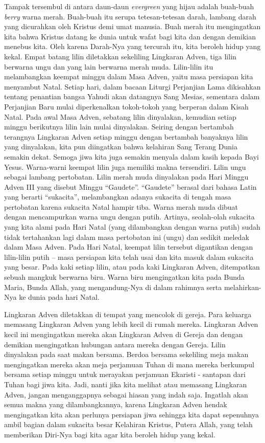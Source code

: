 Tampak tersembul di antara daun-daun \textit{evergreen} yang hijau adalah buah-buah \textit{berry} warna merah. Buah-buah itu serupa tetesan-tetesan darah, lambang darah yang dicurahkan oleh Kristus demi umat manusia. Buah merah itu mengingatkan kita bahwa Kristus datang ke dunia untuk wafat bagi kita dan dengan demikian menebus kita. Oleh karena Darah-Nya yang tercurah itu, kita beroleh hidup yang kekal. Empat batang lilin diletakkan sekeliling Lingkaran Adven, tiga lilin berwarna ungu dan yang lain berwarna merah muda. Lilin-lilin itu melambangkan keempat minggu dalam Masa Adven, yaitu masa persiapan kita menyambut Natal. Setiap hari, dalam bacaan Liturgi Perjanjian Lama dikisahkan tentang penantian bangsa Yahudi akan datangnya Sang Mesias, sementara dalam Perjanjian Baru mulai diperkenalkan tokoh-tokoh yang berperan dalam Kisah Natal. Pada awal Masa Adven, sebatang lilin dinyalakan, kemudian setiap minggu berikutnya lilin lain mulai dinyalakan. Seiring dengan bertambah terangnya Lingkaran Adven setiap minggu dengan bertambah banyaknya lilin yang dinyalakan, kita pun diingatkan bahwa kelahiran Sang Terang Dunia semakin dekat. Semoga jiwa kita juga semakin menyala dalam kasih kepada Bayi Yesus. Warna-warni keempat lilin juga memiliki makna tersendiri. Lilin ungu sebagai lambang pertobatan. Lilin merah muda dinyalakan pada Hari Minggu Adven III yang disebut Minggu ``Gaudete''. ``Gaudete'' berasal dari bahasa Latin yang berarti ``sukacita'', melambangkan adanya sukacita di tengah masa pertobatan karena sukacita Natal hampir tiba. Warna merah muda dibuat dengan mencampurkan warna ungu dengan putih. Artinya, seolah-olah sukacita yang kita alami pada Hari Natal (yang dilambangkan dengan warna putih) sudah tidak tertahankan lagi dalam masa pertobatan ini (ungu) dan sedikit meledak dalam Masa Adven. Pada Hari Natal, keempat lilin tersebut digantikan dengan lilin-lilin putih – masa persiapan kita telah usai dan kita masuk dalam sukacita yang besar. Pada kaki setiap lilin, atau pada kaki Lingkaran Adven, ditempatkan sebuah mangkuk berwarna biru. Warna biru mengingatkan kita pada Bunda Maria, Bunda Allah, yang mengandung-Nya di dalam rahimnya serta melahirkan-Nya ke dunia pada hari Natal.

Lingkaran Adven diletakkan di tempat yang mencolok di gereja. Para keluarga memasang Lingkaran Adven yang lebih kecil di rumah mereka. Lingkaran Adven kecil ini mengingatkan mereka akan Lingkaran Adven di Gereja dan dengan demikian mengingatkan hubungan antara mereka dengan Gereja. Lilin dinyalakan pada saat makan bersama. Berdoa bersama sekeliling meja makan mengingatkan mereka akan meja perjamuan Tuhan di mana mereka berkumpul bersama setiap minggu untuk merayakan perjamuan Ekaristi - santapan dari Tuhan bagi jiwa kita. Jadi, nanti jika kita melihat atau memasang Lingkaran Adven, jangan menganggapnya sebagai hiasan yang indah saja. Ingatlah akan semua makna yang dilambangkannya, karena Lingkaran Adven hendak mengingatkan kita akan perlunya persiapan jiwa sehingga kita dapat sepenuhnya ambil bagian dalam sukacita besar Kelahiran Kristus, Putera Allah, yang telah memberikan Diri-Nya bagi kita agar kita beroleh hidup yang kekal.  


